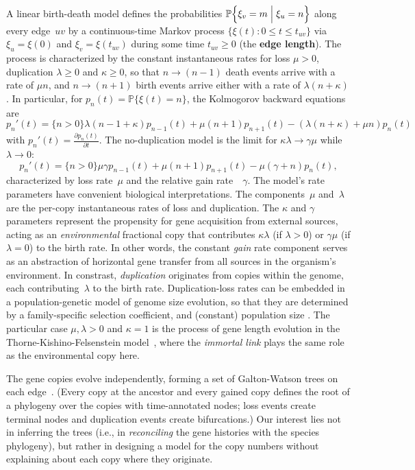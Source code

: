 \documentclass{elsarticle}
\newcommand{\condgen}[6]{{#1}#2 #5 #3 #6 #4}
\newcommand{\PROB}{\mathbb{P}}
\newcommand{\Probcmd}[2]{\condgen{\PROB}{\Bigl\{}{\Bigm|}{\Bigr\}}{#1}{#2}}
\newcommand{\definehere}[1]{\textcolor{webbrown}{\bf #1}}
\newcommand{\nx}{u}
\newcommand{\ny}{v}
\begin{document}
A linear birth-death model defines the probabilities 
$\Probcmd{\xi_{\ny}=m}{\xi_{\nx}=n}$ 
along every edge~$\nx\ny$ by a 
continuous-time Markov process
${\bigl\{\xi(t)\colon 0\le t\le t_{\nx\ny}\bigr\}}$ via 
$\xi_{\nx}=\xi(0)$ and $\xi_{\ny}=\xi(t_{\nx\ny})$ 
during some time $t_{\nx\ny}\ge 0$ (the \definehere{edge length}).
The process is characterized by the
constant instantaneous rates for loss $\mu>0$,
duplication $\lambda\ge 0$ and $\kappa\ge 0$, 
so that $n\to (n-1)$ death events arrive with a rate of $\mu n$, 
and $n\to (n+1)$ birth events arrive either 
with a rate of $\lambda (n+\kappa)$. 
In particular, 
for $p_n(t)=\PROB\{\xi(t)=n\}$, 
the Kolmogorov backward equations are 
\[
p_n'(t)
  =  \{n>0\} \lambda (n-1+\kappa) p_{n-1}(t)+\mu (n+1) p_{n+1}(t)
 	-(\lambda (n+\kappa) +\mu n) p_n(t)
\]
with $p_n'(t)=\frac{\partial p_n(t)}{\partial t}$. 
The no-duplication model 
is the limit for $\kappa\lambda\to\gamma\mu$ while $\lambda\to 0$: 
\[
p_n'(t)
  =  \{n>0\} \mu \gamma p_{n-1}(t)+\mu (n+1) p_{n+1}(t)
 	-\mu (\gamma + n) p_n(t),
\]
characterized by loss rate~$\mu$ and the relative gain rate~~$\gamma$. 
The model's rate parameters have convenient biological interpretations.  
The components~$\mu$ and~$\lambda$ are the per-copy 
instantaneous rates of loss and duplication. 
The $\kappa$ and $\gamma$ parameters represent the propensity for gene acquisition from 
external sources, acting as an {\em environmental} fractional copy that 
contributes $\kappa\lambda$ (if $\lambda>0$) or $\gamma\mu$ (if $\lambda=0$) to the 
birth rate. In other words, the constant {\em gain} rate component serves as an abstraction of horizontal gene transfer 
from all sources in the organism's environment. 
In constrast, {\em duplication} originates from 
copies within the genome, each contributing~$\lambda$ to the birth rate.  
Duplication-loss rates can be embedded in a population-genetic model
of genome size evolution, 
so that they are determined by a family-specific selection coefficient, 
and (constant) population size \cite{SelaWolfKoonin}. 
The particular case $\mu,\lambda>0$ and $\kappa=1$ is 
the process of gene length evolution in the Thorne-Kishino-Felsenstein model~\cite{TKF},
where the {\em immortal link} plays the same role as the environmental copy here.   

The gene copies evolve independently, forming a set of 
Galton-Watson trees on each edge~\cite{Istvan.genecontent}.
(Every copy at the ancestor and every gained copy defines the root
of a phylogeny over the copies with time-annotated nodes;  
loss events create terminal nodes and duplication events create bifurcations.)  
Our interest lies not in inferring the 
trees (i.e., in {\em reconciling} the gene histories with the species phylogeny), 
but rather in designing a model 
for the copy numbers without explaining about each 
copy where they originate.
\end{document}
